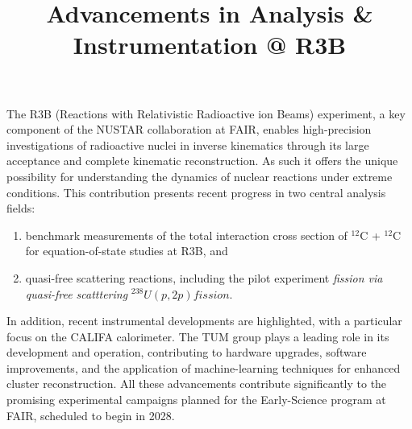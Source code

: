\documentclass[12pt]{article}
\title{Advancements in Analysis \& Instrumentation @ R3B}
\author{}
\date{}
\begin{document}
\maketitle


The R3B (Reactions with Relativistic Radioactive ion Beams) experiment, a key component of the NUSTAR collaboration at FAIR, enables high-precision investigations of radioactive nuclei in inverse kinematics through its large acceptance and complete kinematic reconstruction. As such it offers the unique possibility for understanding the dynamics of nuclear reactions under extreme conditions.
This contribution presents recent progress in two central analysis fields: 
\begin{enumerate}[label=(\roman*)]
\item benchmark measurements of the total interaction cross section of $^{12}$C + $^{12}$C for equation-of-state studies at R3B, and
\item quasi-free scattering reactions, including the pilot experiment \textit{fission via quasi-free scatttering} $^{238}U(p,2p)fission$.
\end{enumerate}

In addition, recent instrumental developments are highlighted, with a particular focus on the CALIFA calorimeter. The TUM group plays a leading role in its development and operation, contributing to hardware upgrades, software improvements, and the application of machine-learning techniques for enhanced cluster reconstruction.
All these advancements contribute significantly to the promising experimental campaigns planned for the Early-Science program at FAIR, scheduled to begin in 2028.

\end{document}
